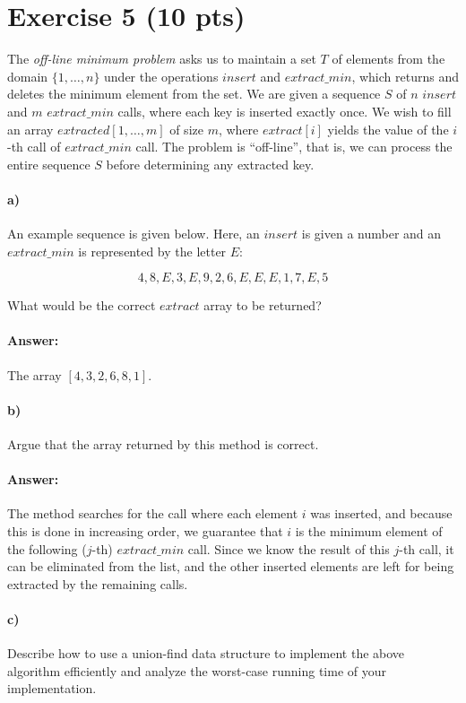 \documentclass[a4paper]{article}
\begin{document}
\section{Exercise 5 (10 pts)}

The \emph{off-line minimum problem} asks us to maintain a set $T$ of elements from the domain $\{1, \ldots, n\}$ under the operations $insert$ and $extract\_min$, which returns and deletes the minimum element from the set. We are given a sequence $S$ of $n$ $insert$ and $m$ $extract\_min$ calls, where each key is inserted exactly once. We wish to fill an array $extracted[1,\ldots, m]$ of size $m$, where $extract[i]$ yields the value of the $i$-th call of $extract\_min$ call. The problem is ``off-line'', that is, we can process the entire sequence $S$ before determining any extracted key.

\paragraph{a)} An example sequence is given below. Here, an $insert$ is given a number and an $extract\_min$ is represented by the letter $E$:

$$4,8,E,3,E,9,2,6,E,E,E,1,7,E,5$$

What would be the correct $extract$ array to be returned?

\paragraph{Answer:} The array $[4, 3, 2, 6, 8, 1]$.

\paragraph{b)} Argue that the array returned by this method is correct.

\paragraph{Answer:} The method searches for the call where each element $i$ was inserted, and because this is done in increasing order, we guarantee that $i$ is the minimum element of the following ($j$-th) $extract\_min$ call. Since we know the result of this $j$-th call, it can be eliminated from the list, and the other inserted elements are left for being extracted by the remaining calls.

\paragraph{c)} Describe how to use a union-find data structure to implement the above algorithm efficiently and analyze the worst-case running time of your implementation. 
\end{document}
